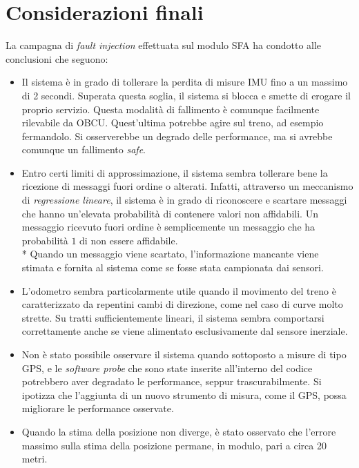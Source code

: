 \section{Considerazioni finali}
La campagna di \emph{fault injection} effettuata sul modulo SFA ha condotto alle conclusioni che seguono:
\begin{itemize}
	\item Il sistema \`e in grado di tollerare la perdita di misure IMU fino a un massimo di 2 secondi. Superata questa soglia, il sistema si blocca e smette di erogare il proprio servizio. Questa modalit\`a di fallimento \`e comunque facilmente rilevabile da OBCU. Quest'ultima potrebbe agire sul treno, ad esempio fermandolo. Si osserverebbe un degrado delle performance, ma si avrebbe comunque un fallimento \emph{safe}.
	\item Entro certi limiti di approssimazione, il sistema sembra tollerare bene la ricezione di messaggi fuori ordine o alterati. Infatti, attraverso un meccanismo di \emph{regressione lineare}, il sistema \`e in grado di riconoscere e scartare messaggi che hanno un'elevata probabilit\`a di contenere valori non affidabili. Un messaggio ricevuto fuori ordine \`e semplicemente un messaggio che ha probabilit\`a $1$ di non essere affidabile.\\*
	Quando un messaggio viene scartato, l'informazione mancante viene stimata e fornita al sistema come se fosse stata campionata dai sensori.
	\item L'odometro sembra particolarmente utile quando il movimento del treno \`e caratterizzato da repentini cambi di direzione, come nel caso di curve molto strette. Su tratti sufficientemente lineari, il sistema sembra comportarsi correttamente anche se viene alimentato esclusivamente dal sensore inerziale.
	\item Non \`e stato possibile osservare il sistema quando sottoposto a misure di tipo GPS, e le \emph{software probe} che sono state inserite all'interno del codice potrebbero aver degradato le performance, seppur trascurabilmente. Si ipotizza che l'aggiunta di un nuovo strumento di misura, come il GPS, possa migliorare le performance osservate.
	\item Quando la stima della posizione non diverge, \`e stato osservato che l'errore massimo sulla stima della posizione permane, in modulo, pari a circa 20 metri.
\end{itemize}